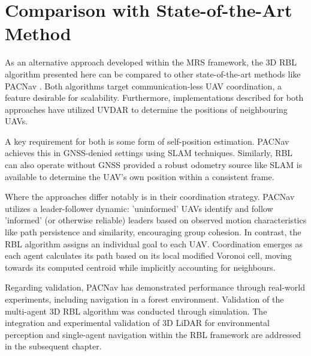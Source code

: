         

    \section{Comparison with State-of-the-Art Method}
        As an alternative approach developed within the MRS framework, the \ac{3D} \ac{RBL} algorithm presented here can be compared to other state-of-the-art methods like PACNav \cite{PACNav}.
        Both algorithms target communication-less UAV coordination, a feature desirable for scalability. 
        Furthermore, implementations described for both approaches have utilized UVDAR to determine the positions of neighbouring UAVs.

        A key requirement for both is some form of self-position estimation. 
        PACNav achieves this in GNSS-denied settings using SLAM techniques. 
        Similarly, \ac{RBL} can also operate without GNSS provided a robust odometry source like SLAM is available to determine the UAV's own position within a consistent frame.

        Where the approaches differ notably is in their coordination strategy. 
        PACNav utilizes a leader-follower dynamic: 'uninformed' UAVs identify and follow 'informed' (or otherwise reliable) leaders based on observed motion characteristics like path persistence and similarity, encouraging group cohesion. 
        In contrast, the RBL algorithm assigns an individual goal to each UAV. 
        Coordination emerges as each agent calculates its path based on its local modified Voronoi cell, moving towards its computed centroid while implicitly accounting for neighbours.

        Regarding validation, PACNav has demonstrated performance through real-world experiments, including navigation in a forest environment. 
        Validation of the multi-agent \ac{3D} RBL algorithm was conducted through simulation.
        The integration and experimental validation of \ac{3D} LiDAR for environmental perception and single-agent navigation within the RBL framework are addressed in the subsequent chapter.


